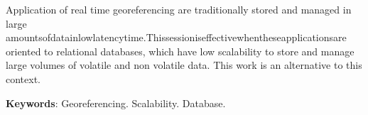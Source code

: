 %
%

\begin{resumo}[Abstract]

Application of real time georeferencing are traditionally stored and managed in large amountsofdatainlowlatencytime.Thissessioniseffectivewhentheseapplicationsare oriented to relational databases, which have low scalability to store and manage large volumes of volatile and non volatile data. This work is an alternative to this context.

\textbf{Keywords}: Georeferencing. Scalability. Database.

\end{resumo}
